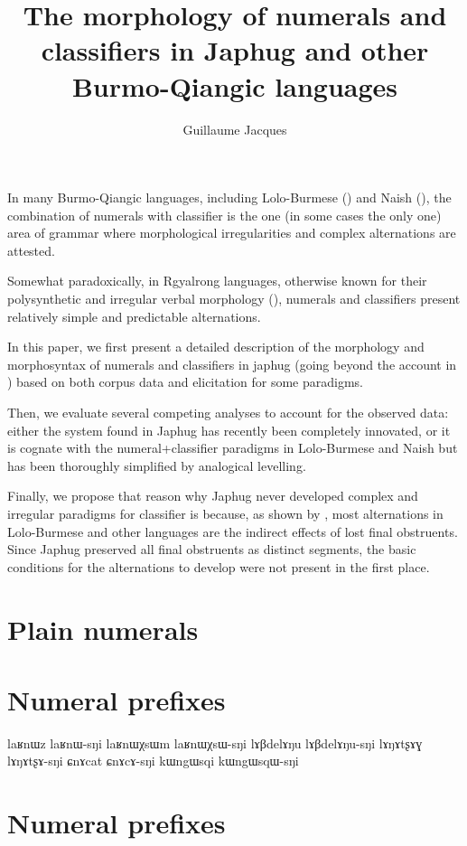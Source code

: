 \documentclass[oldfontcommands,twoside,a4paper,12pt]{article}
\begin{document}
\title{The morphology of numerals and classifiers  in Japhug and other Burmo-Qiangic languages}
\author{Guillaume Jacques}
\maketitle

In many Burmo-Qiangic languages, including Lolo-Burmese (\citealt{bradley05numerals}) and Naish (\citealt{michaud11cl}), the combination of numerals with classifier is the one (in some cases the only one) area of grammar where morphological irregularities and complex alternations are attested.

Somewhat paradoxically, in Rgyalrong languages, otherwise known for their polysynthetic and irregular verbal morphology (\citealt{jacques12incorp}), numerals and classifiers present relatively simple and predictable alternations. 

In this paper, we first present a detailed description of the morphology and morphosyntax of numerals and classifiers in japhug (going beyond the account in   \citealt{jacques08zh}) based on both corpus data and elicitation for some paradigms. 

Then, we evaluate several competing analyses to account for the observed data: either the system found in Japhug has recently been completely innovated, or it is cognate with the numeral+classifier paradigms in Lolo-Burmese and Naish but has been thoroughly simplified by analogical levelling.

Finally, we propose that  reason why Japhug never developed complex and irregular paradigms for classifier is because, as shown by \citet{bradley05numerals}, most alternations in Lolo-Burmese and other languages  are the indirect effects of lost final obstruents. Since Japhug preserved all final obstruents as distinct segments, the basic conditions for the alternations to develop were not present in the first place.


 \section{Plain numerals}

 \section{Numeral prefixes}
 
laʁnɯz	 laʁnɯ-sŋi
laʁnɯχsɯm	laʁnɯχsɯ-sŋi
lɤβdelɤŋu	lɤβdelɤŋu-sŋi
lɤŋɤtʂɤɣ	lɤŋɤtʂɤ-sŋi	
ɕnɤcat	ɕnɤcɤ-sŋi 
kɯngɯsqi	kɯngɯsqɯ-sŋi

 
 \section{Numeral prefixes}




\end{document}
